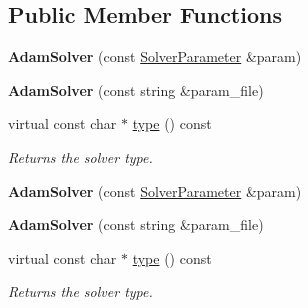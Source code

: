 \subsection*{Public Member Functions}
\begin{DoxyCompactItemize}
\item 
\mbox{\label{classcaffe_1_1_adam_solver_a2591a6002658a955d8df6a2bf1a28f1e}} 
{\bfseries Adam\+Solver} (const \mbox{\hyperlink{classcaffe_1_1_solver_parameter}{Solver\+Parameter}} \&param)
\item 
\mbox{\label{classcaffe_1_1_adam_solver_adfd87b65ecd4c57591eefc24ac16e292}} 
{\bfseries Adam\+Solver} (const string \&param\+\_\+file)
\item 
\mbox{\label{classcaffe_1_1_adam_solver_a3ad927ab9d19ebf2fe2b8a2e9101cb3e}} 
virtual const char $\ast$ \mbox{\hyperlink{classcaffe_1_1_adam_solver_a3ad927ab9d19ebf2fe2b8a2e9101cb3e}{type}} () const
\begin{DoxyCompactList}\small\item\em Returns the solver type. \end{DoxyCompactList}\item 
\mbox{\label{classcaffe_1_1_adam_solver_a2591a6002658a955d8df6a2bf1a28f1e}} 
{\bfseries Adam\+Solver} (const \mbox{\hyperlink{classcaffe_1_1_solver_parameter}{Solver\+Parameter}} \&param)
\item 
\mbox{\label{classcaffe_1_1_adam_solver_adfd87b65ecd4c57591eefc24ac16e292}} 
{\bfseries Adam\+Solver} (const string \&param\+\_\+file)
\item 
\mbox{\label{classcaffe_1_1_adam_solver_a3ad927ab9d19ebf2fe2b8a2e9101cb3e}} 
virtual const char $\ast$ \mbox{\hyperlink{classcaffe_1_1_adam_solver_a3ad927ab9d19ebf2fe2b8a2e9101cb3e}{type}} () const
\begin{DoxyCompactList}\small\item\em Returns the solver type. \end{DoxyCompactList}\end{DoxyCompactItemize}
